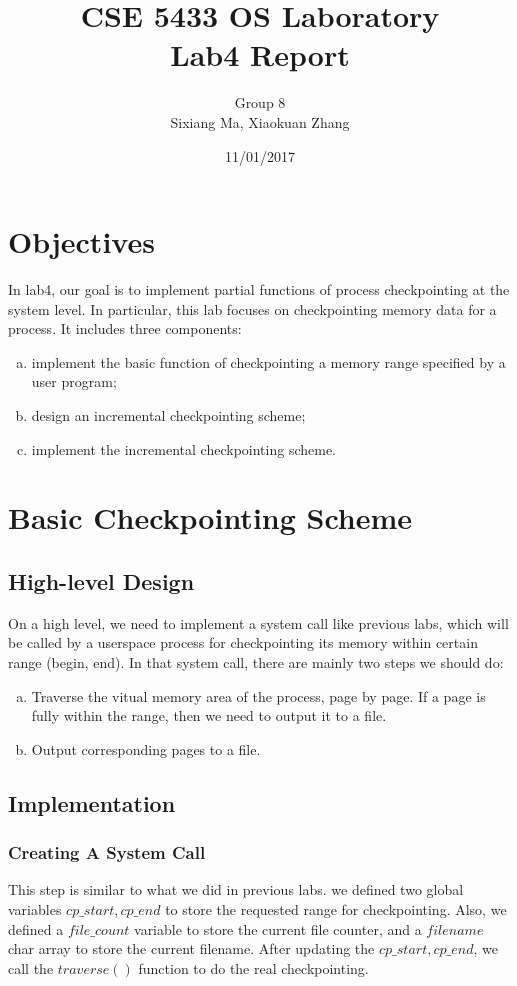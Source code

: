 \documentclass[11pt]{article}
\title{CSE 5433 OS Laboratory \\ Lab4 Report}
\author{Group 8 \\ Sixiang Ma, Xiaokuan Zhang}
\date{11/01/2017}
\begin{document}
\maketitle

\section{Objectives}
In lab4, our goal is to implement partial functions of process checkpointing at the system level. In particular, this lab focuses on checkpointing memory data for a process. It includes three components: 
\begin{enumerate}[(a)]
\item implement the basic function of checkpointing a memory range specified by a user program;
\item design an incremental checkpointing scheme;
\item implement the incremental checkpointing scheme.
\end{enumerate}

\section{Basic Checkpointing Scheme}
\subsection{High-level Design}
On a high level, we need to implement a system call like previous labs, which will be called by a userspace process for checkpointing its memory within certain range (begin, end). In that system call, there are mainly two steps we should do:
\begin{enumerate}[(a)]
\item Traverse the vitual memory area of the process, page by page. If a page is fully within the range, then we need to output it to a file.
\item Output corresponding pages to a file.
\end{enumerate}
\subsection{Implementation}
\subsubsection{Creating A System Call}
This step is similar to what we did in previous labs. we defined two global variables $cp\_start, cp\_end$ to store the requested range for checkpointing. Also, we defined a $file\_count$ variable to store the current file counter, and a $filename$ char array to store the current filename. After updating the $cp\_start, cp\_end$, we call the $traverse()$ function to do the real checkpointing. 
\end{document}
